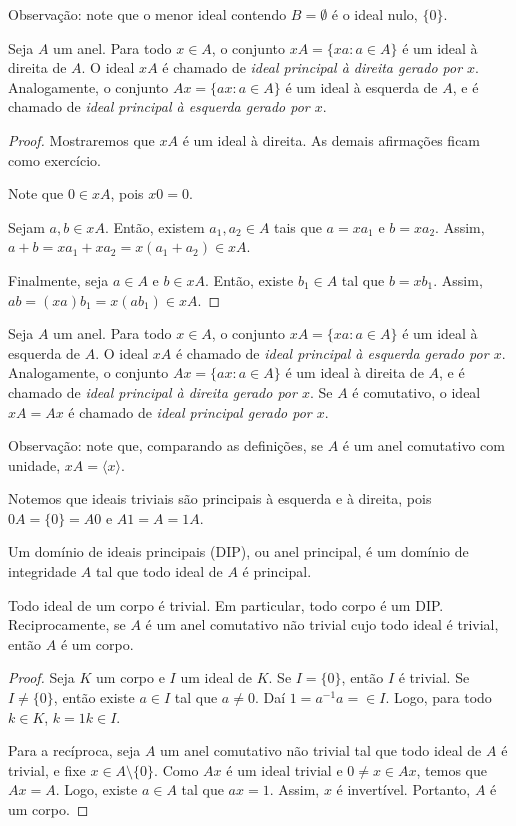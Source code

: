 Observação: note que o menor ideal contendo $B=\emptyset$ é o ideal nulo, $\{0\}$.

\begin{definition}
    Seja $A$ um anel. Para todo $x \in A$, o conjunto $xA=\{xa:a \in A\}$ é um ideal à direita de $A$. O ideal $xA$ é chamado de \emph{ideal principal à direita gerado por $x$}.
    Analogamente, o conjunto $Ax=\{ax:a \in A\}$ é um ideal à esquerda de $A$, e é chamado de \emph{ideal principal à esquerda gerado por $x$}.
\end{definition}
\begin{proof}
Mostraremos que $xA$ é um ideal à direita. As demais afirmações ficam como exercício.

Note que $0 \in xA$, pois $x0=0$.

Sejam $a, b \in xA$. Então, existem $a_1, a_2 \in A$ tais que $a=xa_1$ e $b=xa_2$. Assim, $a+b=xa_1+xa_2=x(a_1+a_2) \in xA$.

Finalmente, seja $a \in A$ e $b \in xA$. Então, existe $b_1 \in A$ tal que $b=xb_1$. Assim, $ab=(xa)b_1=x(ab_1) \in xA$.
\end{proof}
\begin{definition}
    Seja $A$ um anel. Para todo $x \in A$, o conjunto $xA=\{xa:a \in A\}$ é um ideal à esquerda de $A$. O ideal $xA$ é chamado de \emph{ideal principal à esquerda gerado por $x$}.
    Analogamente, o conjunto $Ax=\{ax:a \in A\}$ é um ideal à direita de $A$, e é chamado de \emph{ideal principal à direita gerado por $x$}.
    Se $A$ é comutativo, o ideal $xA=Ax$ é chamado de \emph{ideal principal gerado por $x$}.
\end{definition}

Observação: note que, comparando as definições, se $A$ é um anel comutativo com unidade, $xA=\langle x\rangle$.

Notemos que ideais triviais são principais à esquerda e à direita, pois $0A=\{0\}=A0$ e $A1=A=1A$.

\begin{definition}
    Um domínio de ideais principais (DIP), ou anel principal, é um domínio de integridade $A$ tal que todo ideal de $A$ é principal.
\end{definition}

\begin{prop}
    Todo ideal de um corpo é trivial. Em particular, todo corpo é um DIP. Reciprocamente, se $A$ é um anel comutativo não trivial cujo todo ideal é trivial, então $A$ é um corpo.
\end{prop}
\begin{proof}
Seja $K$ um corpo e $I$ um ideal de $K$. Se $I=\{0\}$, então $I$ é trivial. Se $I\neq \{0\}$, então existe $a \in I$ tal que $a \neq 0$. Daí $1=a^{-1}a=\in I$. Logo, para todo $k \in K$, $k=1k\in I$.

Para a recíproca, seja $A$ um anel comutativo não trivial tal que todo ideal de $A$ é trivial, e fixe $x \in A\setminus \{0\}$. Como $Ax$ é um ideal trivial e $0\neq x \in Ax$, temos que $Ax=A$. Logo, existe $a \in A$ tal que $ax=1$. Assim, $x$ é invertível. Portanto, $A$ é um corpo.
\end{proof}

